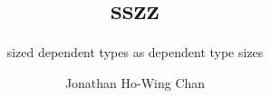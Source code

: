 \documentclass[oneside,onehalfspacing,11pt]{ubcdiss}
\title{sszz}
\subtitle{sized dependent types as dependent type sizes}
\author{Jonathan Ho\hspace{0.1em}-\hspace{-0.1em}Wing Chan}
\begin{document}
\maketitle
\makecommitteepage
\textspacing





\tableofcontents
\listoftables
\listoffigures





\mainmatter






\begin{singlespace}
\raggedright

\end{singlespace}

\appendix


\backmatter
\printindex
\end{document}
